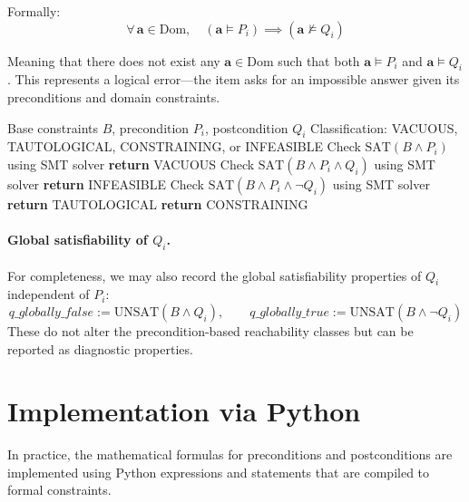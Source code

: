 Formally:
\[
    \forall\,\mathbf{a} \in \mathrm{Dom}, \quad (\mathbf{a} \models P_i) \implies (\mathbf{a} \not\models Q_i)
\]

Meaning that there does not exist any $\mathbf{a} \in \mathrm{Dom}$ such that both $\mathbf{a} \models P_i$ and $\mathbf{a} \models Q_i$. This represents a logical error—the item asks for an impossible answer given its preconditions and domain constraints.

\begin{algorithm}[H]
\caption{Postcondition Classification}
\label{alg:postcondition-classify}
\begin{algorithmic}[1]
\Require Base constraints $B$, precondition $P_i$, postcondition $Q_i$
\Ensure Classification: VACUOUS, TAUTOLOGICAL, CONSTRAINING, or INFEASIBLE
\State Check $\mathrm{SAT}(B \wedge P_i)$ using SMT solver
    \State \textbf{return} VACUOUS 
\EndIf
\State Check $\mathrm{SAT}(B \wedge P_i \wedge Q_i)$ using SMT solver
    \State \textbf{return} INFEASIBLE 
\EndIf
\State Check $\mathrm{SAT}(B \wedge P_i \wedge \neg Q_i)$ using SMT solver
    \State \textbf{return} TAUTOLOGICAL 
\Else
    \State \textbf{return} CONSTRAINING 
\EndIf
\end{algorithmic}
\end{algorithm}

\paragraph{Global satisfiability of $Q_i$.} For completeness, we may also record the global satisfiability properties of $Q_i$ independent of $P_i$:
\[
\textit{q\_globally\_false} := \mathrm{UNSAT}(B \wedge Q_i), \qquad
\textit{q\_globally\_true} := \mathrm{UNSAT}(B \wedge \lnot Q_i)
\]
These do not alter the precondition-based reachability classes but can be reported as diagnostic properties.

\clearpage
\section{Implementation via Python}

In practice, the mathematical formulas for preconditions and postconditions are implemented using Python expressions and statements that are compiled to formal constraints.

